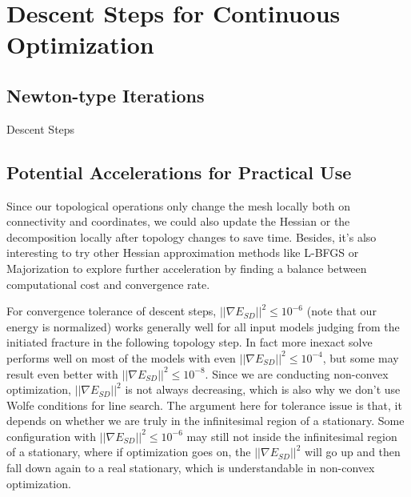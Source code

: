 \section{Descent Steps for Continuous Optimization}

\subsection{Newton-type Iterations}

\begin{algorithm}[h]
\SetAlgoLined
{}
\caption{Descent Steps}
\end{algorithm}

\subsection{Potential Accelerations for Practical Use}

Since our topological operations only change the mesh locally both on connectivity and coordinates, we could also update the Hessian or the decomposition locally after topology changes to save time. Besides, it's also interesting to try other Hessian approximation methods like L-BFGS or Majorization to explore further acceleration by finding a balance between computational cost and convergence rate.

For convergence tolerance of descent steps, $||\nabla E_{SD}||^2 \leq 10^{-6}$ (note that our energy is normalized) works generally well for all input models judging from the initiated fracture in the following topology step. In fact more inexact solve performs well on most of the models with even $||\nabla E_{SD}||^2 \leq 10^{-4}$, but some may result even better with $||\nabla E_{SD}||^2 \leq 10^{-8}$. Since we are conducting non-convex optimization, $||\nabla E_{SD}||^2$ is not always decreasing, which is also why we don't use Wolfe conditions for line search. The argument here for tolerance issue is that, it depends on whether we are truly in the infinitesimal region of a stationary. Some configuration with $||\nabla E_{SD}||^2 \leq 10^{-6}$ may still not inside the infinitesimal region of a stationary, where if optimization goes on, the $||\nabla E_{SD}||^2$ will go up and then fall down again to a real stationary, which is understandable in non-convex optimization.